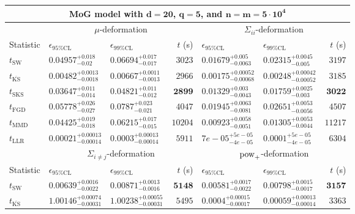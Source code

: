 \begin{tabular}{l|llr|llr}
	\toprule
	\multicolumn{7}{c}{{\bf MoG model with $\mathbf{d=20}$, $\mathbf{q=5}$, and $\mathbf{n=m=5\cdot 10^{4}}$}} \\
	\toprule
	\multicolumn{1}{c}{} & \multicolumn{3}{c}{$\mu$-deformation} & \multicolumn{3}{c}{$\Sigma_{ii}$-deformation} \\
	Statistic & $\epsilon_{95\%\mathrm{CL}}$ & $\epsilon_{99\%\mathrm{CL}}$ & $t$ (s) & $\epsilon_{95\%\mathrm{CL}}$ & $\epsilon_{99\%\mathrm{CL}}$ & $t$ (s) \\
	\midrule
	$t_{\mathrm{SW}}$ & $0.04957_{-0.02}^{+0.018}$ & $0.06694_{-0.017}^{+0.017}$ & $3023$ & $0.01679_{-0.0063}^{+0.005}$ & $0.02315_{-0.005}^{+0.0045}$ & $3197$ \\
	$t_{\overline{\mathrm{KS}}}$ & ${\mathbf{0.00482_{-0.0018}^{+0.0013}}}$ & ${\mathbf{0.00667_{-0.0013}^{+0.0011}}}$ & $2966$ & ${\mathbf{0.00175_{-0.00068}^{+0.00052}}}$ & ${\mathbf{0.00248_{-0.00052}^{+0.00042}}}$ & $3185$ \\
	$t_{\mathrm{SKS}}$ & $0.03647_{-0.014}^{+0.011}$ & $0.04821_{-0.012}^{+0.011}$ & ${\mathbf{2899}}$ & $0.01329_{-0.0043}^{+0.003}$ & $0.01759_{-0.003}^{+0.0025}$ & ${\mathbf{3022}}$ \\
	$t_{\mathrm{FGD}}$ & $0.05778_{-0.027}^{+0.026}$ & $0.0787_{-0.021}^{+0.023}$ & $4047$ & $0.01945_{-0.0081}^{+0.0063}$ & $0.02651_{-0.0056}^{+0.0053}$ & $4507$ \\
	$t_{\mathrm{MMD}}$ & $0.04425_{-0.018}^{+0.019}$ & $0.06215_{-0.015}^{+0.017}$ & $10204$ & $0.00923_{-0.0051}^{+0.0058}$ & $0.01305_{-0.0044}^{+0.0053}$ & $11217$ \\
	$t_{\mathrm{LLR}}$ & $0.00021_{-0.00014}^{+0.00013}$ & $0.0003_{-0.00014}^{+0.00013}$ & $5911$ & $7e-05_{-4e-05}^{+5e-05}$ & $0.0001_{-4e-05}^{+5e-05}$ & $6304$ \\
	\toprule
	\multicolumn{1}{c}{} & \multicolumn{3}{c}{$\Sigma_{i\neq j}$-deformation} & \multicolumn{3}{c}{$\rm{pow}_{+}$-deformation} \\
	Statistic & $\epsilon_{95\%\mathrm{CL}}$ & $\epsilon_{99\%\mathrm{CL}}$ & $t$ (s) & $\epsilon_{95\%\mathrm{CL}}$ & $\epsilon_{99\%\mathrm{CL}}$ & $t$ (s) \\
	\midrule
	$t_{\mathrm{SW}}$ & $0.00639_{-0.0022}^{+0.0016}$ & $0.00871_{-0.0016}^{+0.0013}$ & ${\mathbf{5148}}$ & $0.00581_{-0.0022}^{+0.0017}$ & $0.00798_{-0.0017}^{+0.0015}$ & ${\mathbf{3157}}$ \\
	$t_{\overline{\mathrm{KS}}}$ & $1.00146_{-0.00031}^{+0.00074}$ & $1.00238_{-0.00031}^{+0.00055}$ & $5495$ & ${\mathbf{0.0004_{-0.00017}^{+0.00015}}}$ & ${\mathbf{0.00059_{-0.00014}^{+0.00013}}}$ & $3363$ \\

\end{tabular}

